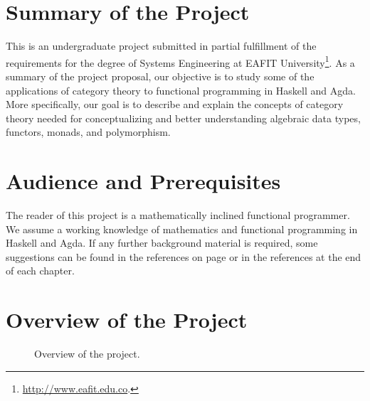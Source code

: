 \section*{Summary of the Project}
\label{sec:introduction-summary}

This is an undergraduate project submitted in partial fulfillment of
the requirements for the degree of Systems Engineering at EAFIT
University\footnote{\url{http://www.eafit.edu.co}.}. As a summary of
the project proposal, our objective is to study some of the
applications of category theory to functional programming in Haskell
and Agda. More specifically, our goal is to describe and explain the
concepts of category theory needed for conceptualizing and better
understanding algebraic data types, functors, monads, and
polymorphism.

\section*{Audience and Prerequisites}
\label{sec:introduction-prerequisites}

The reader of this project is a mathematically inclined functional
programmer. We assume a working knowledge of mathematics and
functional programming in Haskell and Agda. If any further background
material is required, some suggestions can be found in the references
on page \pageref{sec:introduction-references} or in the references at
the end of each chapter.

\section*{Overview of the Project}
\label{sec:introduction-overview}

\begin{figure}[htb]
  \begin{center}
  \end{center}
  \caption{Overview of the project.}
  \label{fig:overview}
\end{figure}

